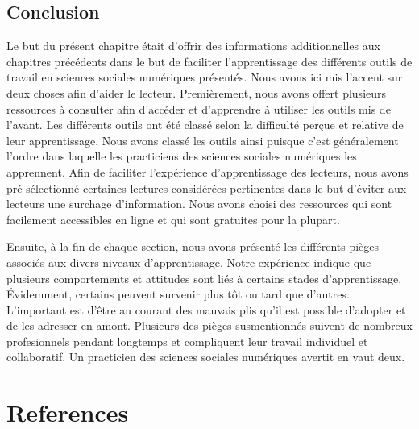 \documentclass[
  letterpaper,
]{scrbook}
\begin{document}
\hypertarget{conclusion-6}{%
\section{Conclusion}\label{conclusion-6}}

Le but du présent chapitre était d'offrir des informations
additionnelles aux chapitres précédents dans le but de faciliter
l'apprentissage des différents outils de travail en sciences sociales
numériques présentés. Nous avons ici mis l'accent sur deux choses afin
d'aider le lecteur. Premièrement, nous avons offert plusieurs ressources
à consulter afin d'accéder et d'apprendre à utiliser les outils mis de
l'avant. Les différents outils ont été classé selon la difficulté perçue
et relative de leur apprentissage. Nous avons classé les outils ainsi
puisque c'est généralement l'ordre dans laquelle les practiciens des
sciences sociales numériques les apprennent. Afin de faciliter
l'expérience d'apprentissage des lecteurs, nous avons pré-sélectionné
certaines lectures considérées pertinentes dans le but d'éviter aux
lecteurs une surchage d'information. Nous avons choisi des ressources
qui sont facilement accessibles en ligne et qui sont gratuites pour la
plupart.

Ensuite, à la fin de chaque section, nous avons présenté les différents
pièges associés aux divers niveaux d'apprentissage. Notre expérience
indique que plusieurs comportements et attitudes sont liés à certains
stades d'apprentissage. Évidemment, certains peuvent survenir plus tôt
ou tard que d'autres. L'important est d'être au courant des mauvais plis
qu'il est possible d'adopter et de les adresser en amont. Plusieurs des
pièges susmentionnés suivent de nombreux profesionnels pendant longtemps
et compliquent leur travail individuel et collaboratif. Un practicien
des sciences sociales numériques avertit en vaut deux.


\hypertarget{references}{%
\chapter*{References}\label{references}}

\end{document}
